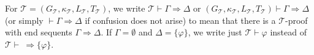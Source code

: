 \documentclass{article}
\theoremstyle{definition}
\newtheorem{defn}{Definition}
\DeclareMathOperator{\Formulas}{Form}
\DeclareMathOperator{\Seq}{Seq}
\DeclareMathOperator{\leaf}{L}
\DeclareMathOperator{\Succ}{Succ}
\begin{document}


For $\mathcal{T}
= (G_\mathcal{T},\kappa_\mathcal{T}, L_\mathcal{T},T_\mathcal{T})$,
we write ${\mathcal{T}} \vdash \Gamma\Rightarrow \Delta$
or $(G_\mathcal{T},\kappa_\mathcal{T}, L_\mathcal{T},T_\mathcal{T})\vdash \Gamma \Rightarrow \Delta$
(or simply 
 $\vdash \Gamma\Rightarrow \Delta$ if confusion does not arise)
 to mean that there is a $\mathcal{T}$-proof with end sequents $\Gamma\Rightarrow \Delta$.
 If $\Gamma=\emptyset$ and $\Delta=\{\varphi\}$, we write just
 ${\mathcal{T}} \vdash \varphi$
 instead of ${\mathcal{T}} \vdash ~\Rightarrow \{\varphi\}$.
 
\end{document}
